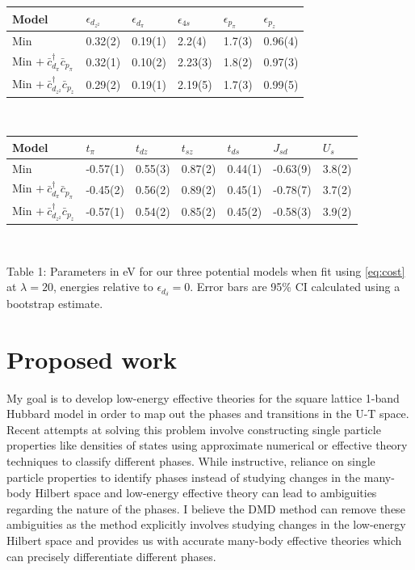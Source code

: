\documentclass[12pt]{article}
\begin{document}
\begin{table}[H]
\begin{center}
\begin{tabular}{l|lllll}
Model &$\epsilon_{d_{z^2}}$ & $\epsilon_{d_\pi}$ & $\epsilon_{4s}$ & $\epsilon_{p_\pi}$ & $\epsilon_{p_z}$ \\ \hline 
Min & 0.32(2)& 0.19(1)& 2.2(4)& 1.7(3)& 0.96(4)\\
Min $ +\ \bar{c}_{d_\pi}^\dagger \bar{c}_{p_\pi}$& 0.32(1)& 0.10(2)& 2.23(3)& 1.8(2)& 0.97(3)\\
Min $ +\ \bar{c}_{d_{z^2}}^\dagger \bar{c}_{p_z}$& 0.29(2)& 0.19(1)& 2.19(5)& 1.7(3)& 0.99(5)\\
\end{tabular} \\

\begin{tabular}{l|llllll}
Model &$t_\pi$ & $t_{dz}$ & $t_{sz}$ & $t_{ds}$ & $J_{sd}$ & $U_s$ \\ \hline 
Min &  -0.57(1)& 0.55(3)& 0.87(2)& 0.44(1)& -0.63(9)& 3.8(2)\\
Min $ +\ \bar{c}_{d_\pi}^\dagger \bar{c}_{p_\pi}$& -0.45(2)& 0.56(2)& 0.89(2)& 0.45(1)& -0.78(7)& 3.7(2)\\
Min $ +\ \bar{c}_{d_{z^2}}^\dagger \bar{c}_{p_z}$& -0.57(1)& 0.54(2)& 0.85(2)& 0.45(2)& -0.58(3)& 3.9(2)\\
\end{tabular} \\

\end{center}
Table 1: Parameters in eV for our three potential models when fit using \eqref{eq:cost} at $\lambda = 20$, energies relative to $\epsilon_{d_\delta} = 0$. Error bars are 95\% CI calculated using a bootstrap estimate.
\end{table}

\section{Proposed work}
My goal is to develop low-energy effective theories for the square lattice 1-band Hubbard model in order to map out the phases and transitions in the U-T space.
Recent attempts at solving this problem involve constructing single particle properties like densities of states using approximate numerical or effective theory techniques to classify different phases.
While instructive, reliance on single particle properties to identify phases instead of studying changes in the many-body Hilbert space and low-energy effective theory can lead to ambiguities regarding the nature of the phases.
I believe the DMD method can remove these ambiguities as the method explicitly involves studying changes in the low-energy Hilbert space and provides us with accurate many-body effective theories which can precisely differentiate different phases.
\end{document}
